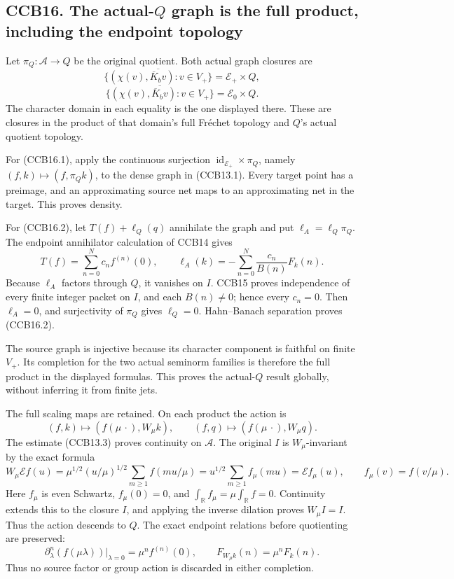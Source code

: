 \subsection{\texorpdfstring{CCB16. The actual-\(Q\) graph is the full
product, including the endpoint
topology}{CCB16. The actual-Q graph is the full product, including the endpoint topology}}\label{ccb16.-the-actual-q-graph-is-the-full-product-including-the-endpoint-topology}

Let \(\pi_Q:\mathcal A\to Q\) be the original quotient. Both actual
graph closures are \[
\boxed{
\overline{\{(\chi(v),\overline K_bv):v\in V_+\}}
=\mathscr E_+\times Q,}
\tag{CCB16.1}
\] \[
\boxed{
\overline{\{(\chi(v),\overline K_bv):v\in V_+\}}
=\mathscr E_0\times Q.}
\tag{CCB16.2}
\] The character domain in each equality is the one displayed there.
These are closures in the product of that domain's full Fréchet topology
and \(Q\)'s actual quotient topology.

For (CCB16.1), apply the continuous surjection
\(\operatorname{id}_{\mathscr E_+}\times\pi_Q\), namely
\((f,k)\mapsto(f,\pi_Qk)\), to the dense graph in (CCB13.1). Every
target point has a preimage, and an approximating source net maps to an
approximating net in the target. This proves density.

For (CCB16.2), let \(T(f)+\ell_Q(q)\) annihilate the graph and put
\(\ell_A=\ell_Q\pi_Q\). The endpoint annihilator calculation of CCB14
gives \[
T(f)=\sum_{n=0}^Nc_nf^{(n)}(0),\qquad
\ell_A(k)=-\sum_{n=0}^N\frac{c_n}{B(n)}F_k(n).
\] Because \(\ell_A\) factors through \(Q\), it vanishes on \(I\). CCB15
proves independence of every finite integer packet on \(I\), and each
\(B(n)\ne0\); hence every \(c_n=0\). Then \(\ell_A=0\), and surjectivity
of \(\pi_Q\) gives \(\ell_Q=0\). Hahn--Banach separation proves
(CCB16.2).

The source graph is injective because its character component is
faithful on finite \(V_+\). Its completion for the two actual seminorm
families is therefore the full product in the displayed formulas. This
proves the actual-\(Q\) result globally, without inferring it from
finite jets.

The full scaling maps are retained. On each product the action is \[
(f,k)\longmapsto(f(\mu\,\cdot),W_\mu k),\qquad
(f,q)\longmapsto(f(\mu\,\cdot),W_\mu q).
\tag{CCB16.3}
\] The estimate (CCB13.3) proves continuity on \(\mathcal A\). The
original \(I\) is \(W_\mu\)-invariant by the exact formula \[
W_\mu\mathcal Ef(u)
=\mu^{1/2}(u/\mu)^{1/2}\sum_{m\ge1}f(mu/\mu)
=u^{1/2}\sum_{m\ge1}f_\mu(mu)
=\mathcal Ef_\mu(u),\qquad f_\mu(v)=f(v/\mu).
\] Here \(f_\mu\) is even Schwartz, \(f_\mu(0)=0\), and
\(\int_{\mathbb R}f_\mu=\mu\int_{\mathbb R}f=0\). Continuity extends
this to the closure \(I\), and applying the inverse dilation proves
\(W_\mu I=I\). Thus the action descends to \(Q\). The exact endpoint
relations before quotienting are preserved: \[
\partial_\lambda^n(f(\mu\lambda))|_{\lambda=0}
=\mu^nf^{(n)}(0),\qquad
F_{W_\mu k}(n)=\mu^nF_k(n).
\] Thus no source factor or group action is discarded in either
completion.

